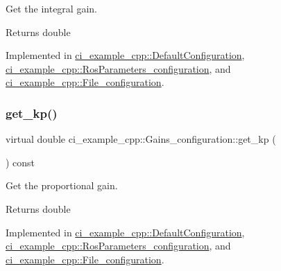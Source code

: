 Get the integral gain. 

\begin{DoxyReturn}{Returns}
double 
\end{DoxyReturn}


Implemented in \hyperlink{classci__example__cpp_1_1DefaultConfiguration_a8853e68911e4fd8baf547ac5cffe38db}{ci\+\_\+example\+\_\+cpp\+::\+Default\+Configuration}, \hyperlink{classci__example__cpp_1_1RosParameters__configuration_a01be945f19c9fc4734f28460a335e731}{ci\+\_\+example\+\_\+cpp\+::\+Ros\+Parameters\+\_\+configuration}, and \hyperlink{classci__example__cpp_1_1File__configuration_a6e338977105cbcf8b822892d1feb9006}{ci\+\_\+example\+\_\+cpp\+::\+File\+\_\+configuration}.

\mbox{\label{classci__example__cpp_1_1Gains__configuration_add5ce511c797cd688e12cee09d8ec0b8}} 
\subsubsection{\texorpdfstring{get\+\_\+kp()}{get\_kp()}}
{\footnotesize\ttfamily virtual double ci\+\_\+example\+\_\+cpp\+::\+Gains\+\_\+configuration\+::get\+\_\+kp (\begin{DoxyParamCaption}{ }\end{DoxyParamCaption}) const\hspace{0.3cm}{\ttfamily [pure virtual]}}



Get the proportional gain. 

\begin{DoxyReturn}{Returns}
double 
\end{DoxyReturn}


Implemented in \hyperlink{classci__example__cpp_1_1DefaultConfiguration_aed613eb3bec06c4459fa3b9e25aefa7c}{ci\+\_\+example\+\_\+cpp\+::\+Default\+Configuration}, \hyperlink{classci__example__cpp_1_1RosParameters__configuration_a49ccc6c0db59063f1475f08dce23ee5d}{ci\+\_\+example\+\_\+cpp\+::\+Ros\+Parameters\+\_\+configuration}, and \hyperlink{classci__example__cpp_1_1File__configuration_a5d051da802569c36feeab2b1fbf9a09a}{ci\+\_\+example\+\_\+cpp\+::\+File\+\_\+configuration}.

